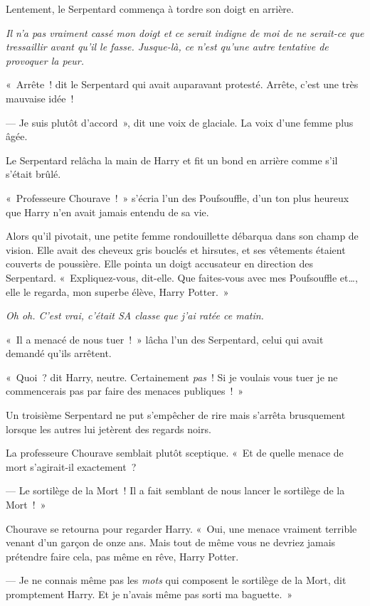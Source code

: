 Lentement, le Serpentard commença à tordre son doigt en arrière.

\emph{Il n'a pas vraiment cassé mon doigt et ce serait indigne de moi de ne serait-ce que tressaillir avant qu'il le fasse.
Jusque-là, ce n'est qu'une autre tentative de provoquer la peur.}

«~Arrête~! dit le Serpentard qui avait auparavant protesté. Arrête, c'est une très mauvaise idée~!

--- Je suis plutôt d'accord~», dit une voix de glaciale. La voix d'une femme plus âgée.

Le Serpentard relâcha la main de Harry et fit un bond en arrière comme s'il s'était brûlé.

«~Professeure Chourave~!~» s'écria l'un des Poufsouffle, d'un ton plus heureux que Harry n'en avait jamais entendu de sa vie.

Alors qu'il pivotait, une petite femme rondouillette débarqua dans son champ de vision.
Elle avait des cheveux gris bouclés et hirsutes, et ses vêtements étaient couverts de poussière.
Elle pointa un doigt accusateur en direction des Serpentard.
«~Expliquez-vous, dit-elle.
Que faites-vous avec mes Poufsouffle et…, elle le regarda, mon superbe élève, Harry Potter.~»

\emph{Oh oh. C'est vrai, c'était SA classe que j'ai ratée ce matin.}

«~Il a menacé de nous tuer~!~» lâcha l'un des Serpentard, celui qui avait demandé qu'ils arrêtent.

«~Quoi~? dit Harry, neutre.
Certainement \emph{pas}~!
Si je voulais vous tuer je ne commencerais pas par faire des menaces publiques~!~»

Un troisième Serpentard ne put s'empêcher de rire mais s'arrêta brusquement lorsque les autres lui jetèrent des regards noirs.

La professeure Chourave semblait plutôt sceptique.
«~Et de quelle menace de mort s'agirait-il exactement~?

--- Le sortilège de la Mort~! Il a fait semblant de nous lancer le sortilège de la Mort~!~»

Chourave se retourna pour regarder Harry.
«~Oui, une menace vraiment terrible venant d'un garçon de onze ans.
Mais tout de même vous ne devriez jamais prétendre faire cela, pas même en rêve, Harry Potter.

--- Je ne connais même pas les \emph{mots} qui composent le sortilège de la Mort, dit promptement Harry. Et je n'avais même pas sorti ma baguette.~»

